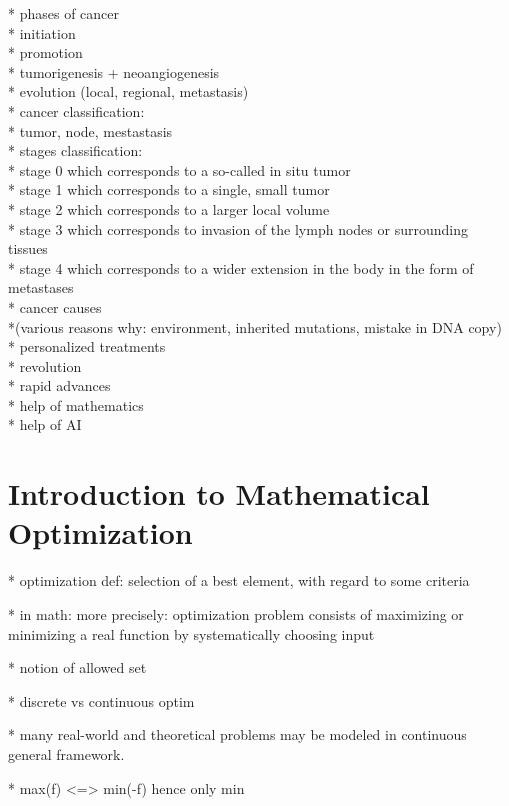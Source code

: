 * phases of cancer\\
  * initiation\\
  * promotion\\
  * tumorigenesis + neoangiogenesis\\
  * evolution (local, regional, metastasis)\\

* cancer classification:\\
  * tumor, node, mestastasis\\
  * stages classification:\\
    * stage 0 which corresponds to a so-called in situ tumor\\
    * stage 1 which corresponds to a single, small tumor\\
    * stage 2 which corresponds to a larger local volume\\
    * stage 3 which corresponds to invasion of the lymph nodes or surrounding tissues\\
    * stage 4 which corresponds to a wider extension in the body in the form of metastases\\

* cancer causes\\
  *(various reasons why: environment, inherited mutations, mistake in DNA copy)\\
 

* personalized treatments\\
  * revolution\\
  * rapid advances\\
  * help of mathematics\\
  * help of AI\\

\section{Introduction to Mathematical Optimization}

* optimization def: selection of a best element, with regard to some criteria

* in math: more precisely: optimization problem consists of maximizing or minimizing a real function by systematically choosing input

* notion of allowed set

* discrete vs continuous optim

* many real-world and theoretical problems may be modeled in continuous general framework. 

* max(f) <=> min(-f) hence only min

